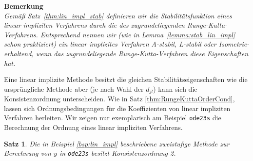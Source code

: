 \documentclass[
]{mycourse}
\theoremstyle{mythm}
\newtheorem{theorem}{Satz}[chapter]
\theoremstyle{break}
\begin{document}
\textbf{Bemerkung}\\
{\it Gemäß Satz~\ref{thm:lin_impl_stab} definieren wir die Stabilitätsfunktion eines
linear impliziten Verfahrens durch die des zugrundeliegenden Runge-Kutta-Verfahrens. Entsprechend nennen wir (wie in Lemma~\ref{lemma:stab_lin_impl} schon praktiziert) 
ein linear implizites Verfahren A-stabil, L-stabil oder Isometrie-erhaltend, wenn das 
zugrundeliegende Runge-Kutta-Verfahren diese Eigenschaften hat.}

Eine linear implizite Methode besitzt die gleichen Stabilitätseigenschaften wie die ursprüngliche Methode aber (je nach Wahl der $d_{jl}$) kann sich die Konsistenzordnung unterscheiden. Wie in Satz \ref{thm:RungeKuttaOrderCond}, lassen sich Ordnungsbedingungen für die Koeffizienten von linear impliziten Verfahren herleiten. 
Wir zeigen nur exemplarisch am Beispiel \verb.ode23s. die Berechnung der Ordnung eines linear impliziten Verfahrens.

\begin{theorem}
Die in Beispiel \ref{bsp:lin_impl} beschriebene zweistufige Methode zur Berechnung von $y$ in \verb.ode23s. besitzt Konsistenzordnung 2.
\end{theorem}
\end{document}
